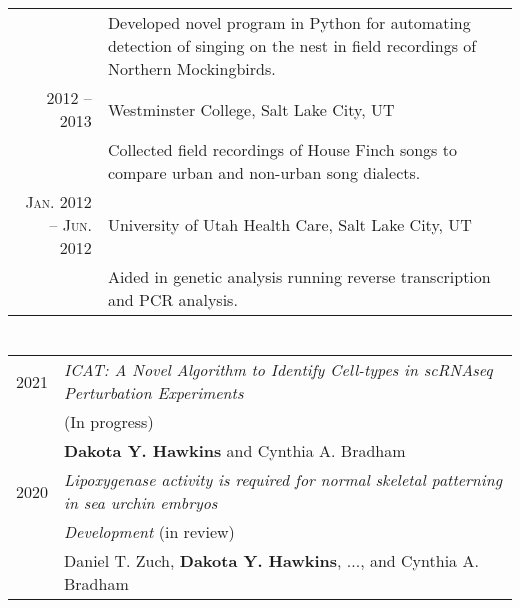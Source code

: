 \documentclass[a4paper,10pt]{article}
\begin{document}
\begin{tabular}{rp{10cm}}
& \footnotesize{Developed novel program in Python for automating detection of
                singing on the nest in field recordings of Northern Mockingbirds.}\\
\textsc{2012 -- 2013} & Westminster College, Salt Lake City, UT\\
& \footnotesize{Collected field recordings of House Finch songs to compare urban
                and non-urban song dialects.}\\
\textsc{Jan. 2012 -- Jun. 2012} & University of Utah Health Care, Salt Lake City, UT
\\& \footnotesize{Aided in genetic analysis running reverse transcription and PCR analysis.}
\end{tabular}

\section{\color{linkcolour}{Publications}}
\begin{tabular}{rp{10cm}}
	\textsc{2021} & \emph{ICAT: A Novel Algorithm to Identify Cell-types in scRNAseq Perturbation Experiments} \\
	              & (In progress) \\
				  & \small{\textbf{Dakota Y. Hawkins} and Cynthia A. Bradham} \\
	\textsc{2020} & \emph{Lipoxygenase activity is required for normal skeletal patterning in sea urchin embryos} \\
				  & \emph{Development} (in review) \\
				  & \small{Daniel T. Zuch, \textbf{Dakota Y. Hawkins}, ...,
					       and Cynthia A. Bradham} \\
\end{tabular}

\end{document}
